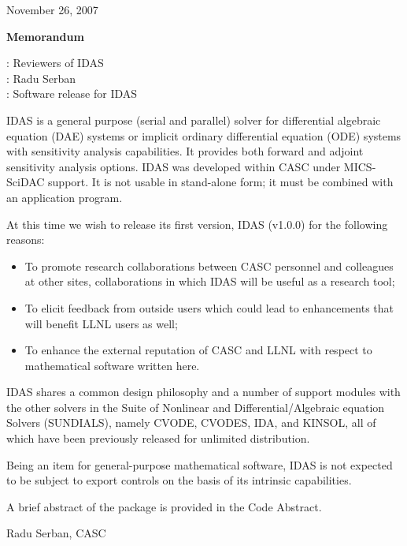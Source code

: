 \documentclass[12pt]{letter}
\begin{document}
\pagestyle{empty}

\begin{letter}

\hfill November 26, 2007

\vspace{0.2in}
\centerline{\bf Memorandum}

: Reviewers of IDAS \\
: Radu Serban \\
: Software release for IDAS

IDAS is a general purpose (serial and parallel) solver for differential algebraic
equation (DAE) systems or implicit ordinary differential equation (ODE) systems
with sensitivity analysis capabilities. It provides both forward and adjoint
sensitivity analysis options.
IDAS was developed within CASC under MICS-SciDAC support. 
It is not usable in stand-alone form; it must be combined with an application program.

At this time we wish to release its first version, IDAS (v1.0.0) for the 
following reasons:
\begin{itemize}
\item To promote research collaborations between CASC personnel and colleagues at 
      other sites, collaborations in which IDAS will be useful as a research tool;
\item To elicit feedback from outside users which could lead to enhancements that will 
      benefit LLNL users as well;
\item To enhance the external reputation of CASC and LLNL with respect to 
      mathematical software written here.
\end{itemize}

IDAS shares a common design philosophy and a number of support modules with the 
other solvers in the Suite of Nonlinear and Differential/Algebraic equation Solvers (SUNDIALS), 
namely CVODE, CVODES, IDA, and KINSOL, all of which have been previously released for unlimited 
distribution.

Being an item for general-purpose mathematical software, IDAS is not expected to be 
subject to export controls on the basis of its intrinsic capabilities. 

A brief abstract of the package is provided in the Code Abstract. 

\vspace{0.5in}                 
\hfill Radu Serban, CASC

\end{letter}
\end{document}
